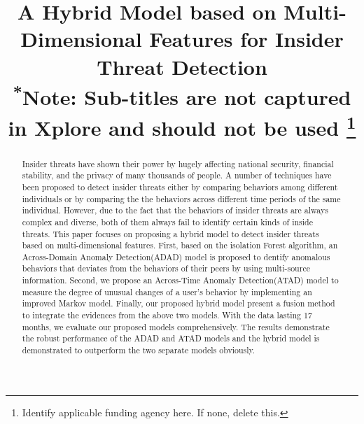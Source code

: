 \documentclass[conference]{IEEEtran}
\begin{document}
\title{A Hybrid Model based on Multi-Dimensional Features for Insider Threat Detection\\
{\footnotesize \textsuperscript{*}Note: Sub-titles are not captured in Xplore and
should not be used}
\thanks{Identify applicable funding agency here. If none, delete this.}
}

\author{
\and
{}

}

\maketitle

\begin{abstract}
Insider threats have shown their power by hugely affecting national security, financial stability, and the privacy of many thousands of people.
A number of techniques have been proposed to detect insider threats either by comparing behaviors  among different individuals or by comparing the the behaviors across different time periods of the same individual. However, due to the  fact that the behaviors of insider threats are always complex and diverse, both of them always fail to identify certain kinds of inside threats.
This paper focuses on proposing a hybrid model to detect insider threats  based on multi-dimensional features.
First, based on the isolation Forest algorithm,  
an Across-Domain Anomaly Detection(ADAD) model is proposed to dentify anomalous behaviors that deviates from the behaviors of their peers by using multi-source information. Second, we propose an Across-Time Anomaly Detection(ATAD) model to measure the degree of unusual changes of a user's behavior  by implementing an improved Markov model. Finally, our proposed hybrid model present a fusion
method to integrate the evidences from the above two models. With the data lasting 17 months, we evaluate our proposed models comprehensively. The results demonstrate the robust performance of the ADAD and ATAD models and the hybrid model is demonstrated to outperform the two separate models obviously.


\end{abstract}
\end{document}
